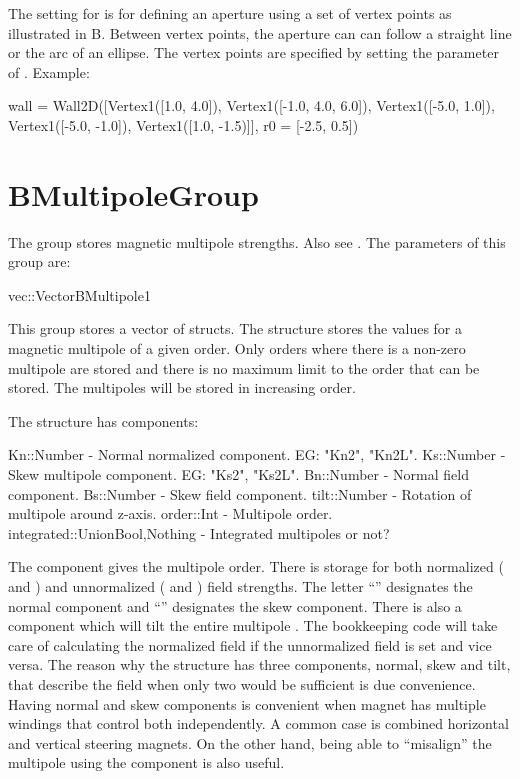 The  setting for  is for defining an aperture using a 
set of vertex points as illustrated in B. Between vertex points, the aperture
can can follow a straight line or the arc of an ellipse. The vertex points are specified by
setting the  parameter of . Example:
\begin{example}
  wall = Wall2D([Vertex1([1.0, 4.0]), Vertex1([-1.0, 4.0, 6.0]), 
                 Vertex1([-5.0, 1.0]), Vertex1([-5.0, -1.0]), 
                 Vertex1([1.0, -1.5)]], r0 = [-2.5, 0.5]) 
\end{example}

\section{BMultipoleGroup}
\label{s:bmultipole.g}

The  group stores magnetic multipole strengths. Also see .
The parameters of this group are:
\begin{example}
  vec::Vector{BMultipole1}
\end{example}
This group stores a vector of  structs.
The  structure stores the values for a magnetic multipole of a given order.
Only orders where there is a non-zero multipole are stored and there is no maximum limit to the 
order that can be stored. The multipoles will be stored in increasing order.

The  structure has components:
\begin{example}
  Kn::Number     - Normal normalized component. EG: "Kn2", "Kn2L".
  Ks::Number     - Skew multipole component. EG: "Ks2", "Ks2L".
  Bn::Number     - Normal field component.
  Bs::Number     - Skew field component.
  tilt::Number   - Rotation of multipole around z-axis.
  order::Int     - Multipole order.
  integrated::Union{Bool,Nothing} - Integrated multipoles or not? 
\end{example}
The  component gives the multipole order.
There is storage for both normalized ( and ) and unnormalized ( and )
field strengths. The letter ``'' designates the normal component and ``'' designates
the skew component. 
There is also a  component which will tilt the entire multipole .
The \accellat bookkeeping code will take care of calculating the normalized field if the unnormalized
field is set and vice versa. The reason why the structure has three components, 
normal, skew and tilt, that describe the field when only two would be sufficient is due convenience.
Having normal and skew components is convenient when magnet has multiple windings that control
both independently. A common case is combined horizontal and vertical steering magnets. On the
other hand, being able to ``misalign'' the multipole using the  component is also
useful.

